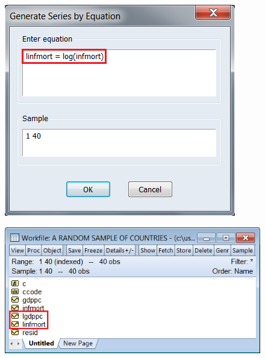 \documentclass[12pt]{report}
\begin{document}
\vspace{-\baselineskip}
\begin{figure}[H]
	\centerline{\includegraphics{2018sem2_q1_11}}
\end{figure}
\vspace{-\baselineskip}
\begin{figure}[H]
	\centerline{\includegraphics{2018sem2_q1_12}}
\end{figure}
\vspace{-\baselineskip}
\end{document}
